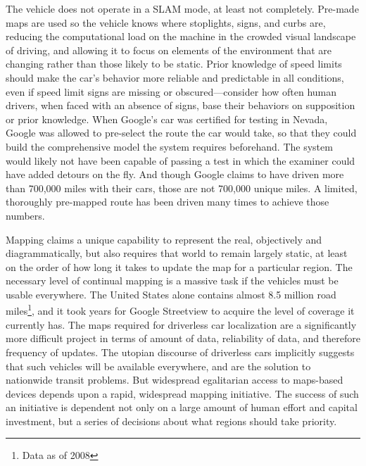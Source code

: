 The vehicle does not operate in a SLAM mode, at least not completely.
Pre-made maps are used so the vehicle knows where stoplights, signs,
and curbs are, reducing the computational load on the machine in the
crowded visual landscape of driving, and allowing it to focus on
elements of the environment that are changing rather than those likely
to be static.\cite{gomesObstacles} Prior knowledge of speed limits should make the car's
behavior more reliable and predictable in all conditions, even if
speed limit signs are missing or obscured---consider how often human
drivers, when faced with an absence of signs, base their behaviors on
supposition or prior knowledge. When Google's car was certified for
testing in Nevada, Google was allowed to pre-select the route the car
would take, so that they could build the comprehensive model the
system requires beforehand.\cite{harrisNevada} The system would likely not have been
capable of passing a test in which the examiner could have added
detours on the fly. And though Google claims to have driven more than
700,000 miles with their cars, those are not 700,000 unique miles. A
limited, thoroughly pre-mapped route has been driven many times to
achieve those numbers.\cite{gomesCircles}

Mapping claims a unique capability to
represent the real, objectively
and diagrammatically, but also requires that world to remain largely
static, at least on the order of how long it takes to update the map
for a particular region. The necessary level of continual mapping is a massive task if the
vehicles must be usable everywhere. The United States alone contains almost
8.5 million road miles\footnote{Data as of 2008\cite{carneyMiles}},
and it took years for Google Streetview to acquire the level of
coverage it currently has. The maps required for driverless car
localization are a significantly more difficult project in terms of
amount of data, reliability of data, and therefore frequency of
updates. The utopian discourse of driverless cars
implicitly suggests that such vehicles will be available everywhere,
and are the solution to nationwide transit problems. But widespread
egalitarian access to maps-based devices depends upon a rapid,
widespread mapping initiative. The success of such an initiative is
dependent not only on a large amount of human effort and capital
investment, but a series of decisions about what regions should take priority.

